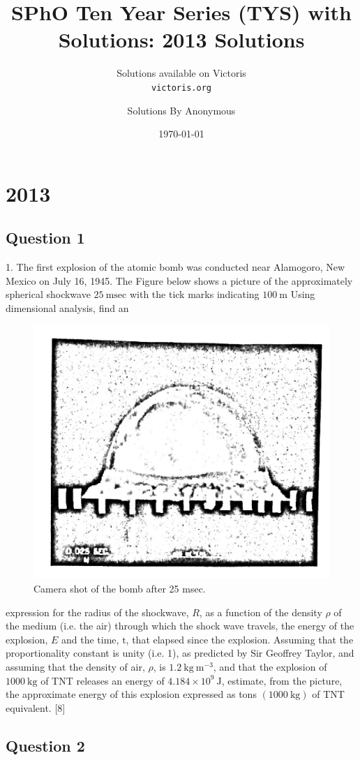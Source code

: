 \documentclass{article}
\title{SPhO Ten Year Series (TYS) with Solutions: 2013 Solutions}
\author{
    Solutions available on Victoris\\
    \texttt{victoris.org}
    \and 
    Solutions By Anonymous
}
\date{\today}
\begin{document}
\maketitle


\section{2013}

\subsection{Question 1}
1. The first explosion of the atomic bomb was conducted near Alamogoro, New Mexico on July 16, 1945. The Figure below shows a picture of the approximately spherical shockwave $25 \mathrm{~msec}$ with the tick marks indicating $100 \mathrm{~m}$ Using dimensional analysis, find an

\begin{figure}
	\centering
	\includegraphics[width=0.5\linewidth]{spho_book_TYS_images/2013q1.png}
	\caption{Camera shot of the bomb after 25 msec.}
\end{figure}

expression for the radius of the shockwave, $R$, as a function of the density $\rho$ of the medium (i.e. the air) through which the shock wave travels, the energy of the explosion, $E$ and the time, $\mathrm{t}$, that elapsed since the explosion.
Assuming that the proportionality constant is unity (i.e. 1), as predicted by Sir Geoffrey Taylor, and assuming that the density of air, $\rho$, is $1.2 \mathrm{~kg} \mathrm{~m}^{-3}$, and that the explosion of $1000 \mathrm{~kg}$ of TNT releases an energy of $4.184 \times 10^{9} \mathrm{~J}$, estimate, from the picture, the approximate energy of this explosion expressed as tons $(1000 \mathrm{~kg})$ of TNT equivalent. [8]

\subsection{Question 2}
\end{document}
